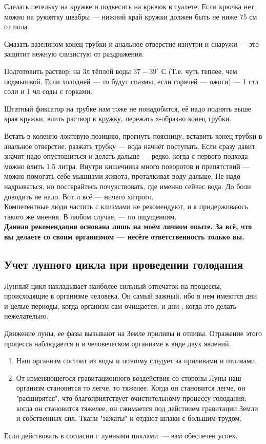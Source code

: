 Сделать петельку на кружке и подвесить на крючок в туалете. Если крючка нет, можно на рукоятку швабры — нижний край кружки должен быть не ниже 75 см от пола.

Смазать вазелином конец трубки и анальное отверстие изнутри и снаружи — это защитит нежную слизистую от раздражения. 

Подготовить раствор: на 3л тёплой воды $37-39^{\circ}$ С (Т.е. чуть теплее, чем подмышкой. Если холодней — то будут спазмы, если горячей — ожоги) — 1 стл соли и 1 чл соды с горками.

Штатный фиксатор на трубке нам тоже не понадобится, её надо поднять выше края кружки, влить раствор в кружку, пережать z-образно конец трубки.

Встать в коленно-локтевую позицию, прогнуть поясницу, вставить конец трубки в анальное отверстие, разжать трубку — вода начнёт поступать. Если сразу давит, значит надо опустошиться и делать дальше — редко, когда с первого подхода можно влить 1,5 литра. Внутри кишечника много поворотов и препятствий — можно помогать себе мышцами живота, проталкивая воду дальше. Не надо надрываться, но постарайтесь почувствовать, где именно сейчас вода. До боли доводить не надо. Вот и всё — ничего хитрого.
\\

Компетентные люди частить с клизмами не рекомендуют, и я придерживаюсь такого же мнения. В любом случае, — по ощущениям.
\\

\textbf{Данная рекомендация основана лишь на моём личном опыте. За всё, что вы делаете со своим организмом — несёте ответственность только вы.}


\subsection{Учет лунного цикла при проведении голодания}\label{fasting3}

Лунный цикл накладывает наиболее сильный отпечаток на процессы, происходящие в организме человека. Он самый важный, ибо в нем имеются дни и целые периоды, когда организм сам очищается, и дни , когда это делать нежелательно.

Движение луны, ее фазы вызывают на Земле приливы и отливы. Отражение этого процесса наблюдается и в человеческом организме в виде двух явлений.
\begin{enumerate}
\item Наш организм состоит из воды и поэтому следует за приливами и отливами.
\item От изменяющегося гравитационного воздействия со стороны Луны наш организм становится то легче, то тяжелее. Когда он становится легче, он "расширятся", что благоприятствует очистительному процессу голодания; когда он становится тяжелее, он сжимается под действием гравитации Земли и собственных сил. Ткани "зажаты" и отдают шлаки с большим трудом.
\end{enumerate}
Если действовать в согласии с лунными циклами~--- вам обеспечен успех.

